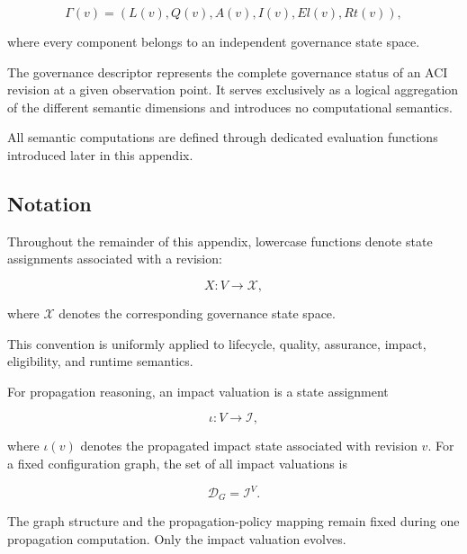 \documentclass[10pt]{article}
\begin{document}
	\begin{equation}
		\Gamma(v)=
		\left(
		L(v),
		Q(v),
		A(v),
		I(v),
		El(v),
		Rt(v)
		\right),
		\label{eq:descriptor_definition}
	\end{equation}
	
	where every component belongs to an independent governance state space.
	
	The governance descriptor represents the complete governance status of an ACI revision at a given observation point. It serves exclusively as a logical aggregation of the different semantic dimensions and introduces no computational semantics.
	
	All semantic computations are defined through dedicated evaluation functions introduced later in this appendix.
	
	\subsection{Notation}
	
	Throughout the remainder of this appendix, lowercase functions denote state assignments associated with a revision:
	
	\begin{equation}
		X:V\rightarrow\mathcal{X},
		\label{eq:state_assignment}
	\end{equation}
	
	where $\mathcal{X}$ denotes the corresponding governance state space.
	
	This convention is uniformly applied to lifecycle, quality, assurance, impact, eligibility, and runtime semantics.
	
	For propagation reasoning, an impact valuation is a state assignment
	
	\begin{equation}
		\iota : V \rightarrow \mathcal{I},
		\label{eq:impact_valuation}
	\end{equation}
	
	where $\iota(v)$ denotes the propagated impact state associated with revision
	$v$. For a fixed configuration graph, the set of all impact valuations is
	
	\begin{equation}
		\mathcal{D}_{G}
		=
		\mathcal{I}^{V}.
		\label{eq:impact_valuation_domain}
	\end{equation}
	
	The graph structure and the propagation-policy mapping remain fixed during one
	propagation computation. Only the impact valuation evolves.
	
\end{document}
